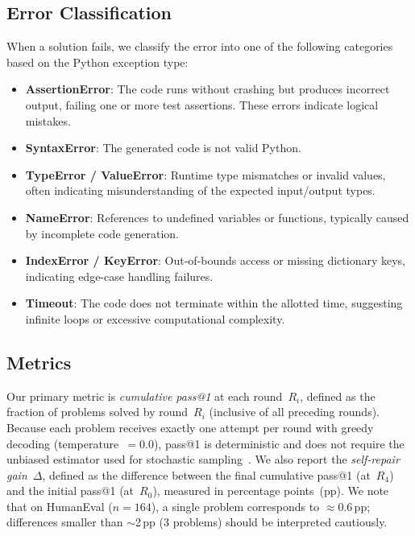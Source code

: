 \documentclass[conference]{IEEEtran}
\begin{document}
\subsection{Error Classification}

When a solution fails, we classify the error into one of the following categories based on the Python exception type:
\begin{itemize}
    \item \textbf{AssertionError}: The code runs without crashing but produces incorrect output, failing one or more test assertions. These errors indicate logical mistakes.
    \item \textbf{SyntaxError}: The generated code is not valid Python.
    \item \textbf{TypeError / ValueError}: Runtime type mismatches or invalid values, often indicating misunderstanding of the expected input/output types.
    \item \textbf{NameError}: References to undefined variables or functions, typically caused by incomplete code generation.
    \item \textbf{IndexError / KeyError}: Out-of-bounds access or missing dictionary keys, indicating edge-case handling failures.
    \item \textbf{Timeout}: The code does not terminate within the allotted time, suggesting infinite loops or excessive computational complexity.
\end{itemize}

\subsection{Metrics}

Our primary metric is \emph{cumulative pass@1} at each round~$R_i$, defined as the fraction of problems solved by round~$R_i$ (inclusive of all preceding rounds). Because each problem receives exactly one attempt per round with greedy decoding (temperature~$=0.0$), pass@1 is deterministic and does not require the unbiased estimator used for stochastic sampling~\cite{chen2021evaluating}. We also report the \emph{self-repair gain}~$\Delta$, defined as the difference between the final cumulative pass@1 (at~$R_4$) and the initial pass@1 (at~$R_0$), measured in percentage points~(pp). We note that on HumanEval ($n=164$), a single problem corresponds to $\approx$0.6\,pp; differences smaller than $\sim$2\,pp (3 problems) should be interpreted cautiously.

\end{document}
